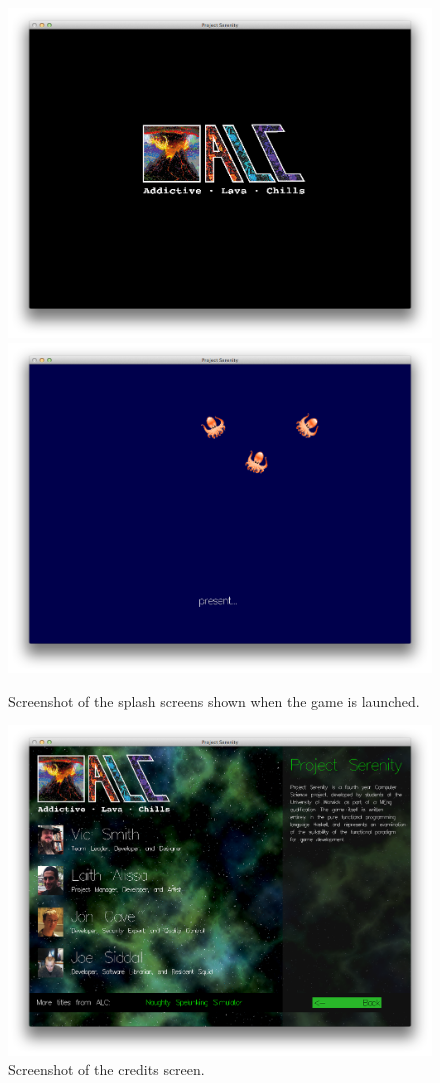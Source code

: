 \begin{figure}[p]
	\includegraphics[width=15.5cm]{res/serenityscreens/07-splash1}
	\includegraphics[width=15.5cm]{res/serenityscreens/08-splash2}
	\caption[Splash screens shown on launch]{Screenshot of the splash screens shown when the game is launched.}
	\label{fig:splash}
\end{figure}

\begin{figure}[p]
	\includegraphics[width=15.5cm]{res/serenityscreens/05-credits}
	\caption[Screenshot of the credits screen]{Screenshot of the credits screen.}
	\label{fig:credits}
\end{figure}
